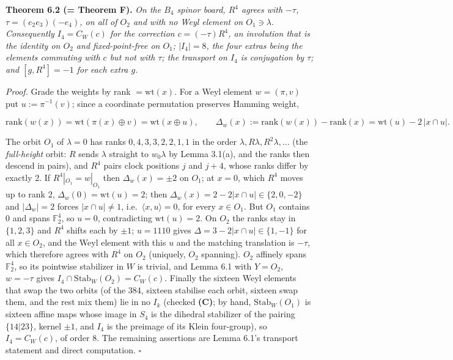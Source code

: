\documentclass[
]{article}
\begin{document}
\textbf{Theorem 6.2 (= Theorem F).} \emph{On the \(B_4\) spinor board,
\(R^4\) agrees with \(-\tau\), \(\tau = (e_2e_3)(-e_4)\), on all of
\(O_2\) and with no Weyl element on \(O_1 \ni \lambda\). Consequently
\(I_4 = C_W(c)\) for the correction \(c = (-\tau)R^4\), an involution
that is the identity on \(O_2\) and fixed-point-free on \(O_1\);
\(|I_4| = 8\), the four extras being the elements commuting with \(c\)
but not with \(\tau\); the transport on \(I_4\) is conjugation by
\(\tau\); and \([g, R^4] = -1\) for each extra \(g\).}

\emph{Proof.} Grade the weights by rank \(= \mathrm{wt}(x)\). For a Weyl
element \(w = (\pi, v)\) put \(u := \pi^{-1}(v)\); since a coordinate
permutation preserves Hamming weight,

\[\mathrm{rank}(w(x)) = \mathrm{wt}(\pi(x) \oplus v) = \mathrm{wt}(x \oplus u), \qquad \Delta_w(x) := \mathrm{rank}(w(x)) - \mathrm{rank}(x) = \mathrm{wt}(u) - 2\,|x \cap u| .\]

The orbit \(O_1\) of \(\lambda = 0\) has ranks
\(0, 4, 3, 3, 2, 2, 1, 1\) in the order
\(\lambda, R\lambda, R^2\lambda, \dots\) (the \emph{full-height} orbit:
\(R\) sends \(\lambda\) straight to \(w_0\lambda\) by Lemma 3.1(a), and
the ranks then descend in pairs), and \(R^4\) pairs clock positions
\(j\) and \(j+4\), whose ranks differ by exactly 2. If
\(R^4|_{O_1} = w|_{O_1}\) then \(\Delta_w(x) = \pm 2\) on \(O_1\); at
\(x = 0\), which \(R^4\) moves up to rank 2,
\(\Delta_w(0) = \mathrm{wt}(u) = 2\); then
\(\Delta_w(x) = 2 - 2|x \cap u| \in \{2, 0, -2\}\) and
\(|\Delta_w| = 2\) forces \(|x \cap u| \ne 1\),
i.e.~\(\langle x, u \rangle = 0\), for every \(x \in O_1\). But \(O_1\)
contains \(0\) and spans \(\mathbb{F}_2^4\), so \(u = 0\), contradicting
\(\mathrm{wt}(u) = 2\). On \(O_2\) the ranks stay in \(\{1,2,3\}\) and
\(R^4\) shifts each by \(\pm 1\); \(u = 1110\) gives
\(\Delta = 3 - 2|x \cap u| \in \{1,-1\}\) for all \(x \in O_2\), and the
Weyl element with this \(u\) and the matching translation is \(-\tau\),
which therefore agrees with \(R^4\) on \(O_2\) (uniquely, \(O_2\)
spanning). \(O_2\) affinely spans \(\mathbb{F}_2^4\), so its pointwise
stabilizer in \(W\) is trivial, and Lemma 6.1 with \(Y = O_2\),
\(w = -\tau\) gives \(I_4 \cap \mathrm{Stab}_W(O_2) = C_W(c)\). Finally
the sixteen Weyl elements that swap the two orbits (of the 384, sixteen
stabilise each orbit, sixteen swap them, and the rest mix them) lie in
no \(I_k\) (checked \textbf{(C)}; by hand, \(\mathrm{Stab}_W(O_1)\) is
sixteen affine maps whose image in \(S_4\) is the dihedral stabilizer of
the pairing \(\{14|23\}\), kernel \(\pm 1\), and \(I_4\) is the preimage
of its Klein four-group), so \(I_4 = C_W(c)\), of order 8. The remaining
assertions are Lemma 6.1's transport statement and direct computation.
\(\square\)
\end{document}
